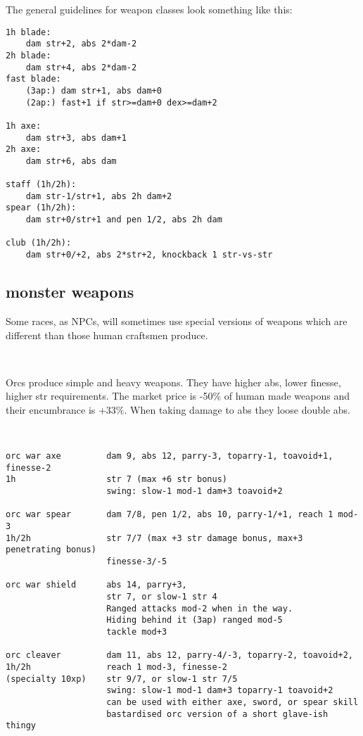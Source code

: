 The general guidelines for weapon classes look something like this:\\
\small \begin{verbatim}
1h blade:
    dam str+2, abs 2*dam-2
2h blade:
    dam str+4, abs 2*dam-2
fast blade:
    (3ap:) dam str+1, abs dam+0
    (2ap:) fast+1 if str>=dam+0 dex>=dam+2

1h axe:
    dam str+3, abs dam+1
2h axe:
    dam str+6, abs dam

staff (1h/2h):
    dam str-1/str+1, abs 2h dam+2
spear (1h/2h):
    dam str+0/str+1 and pen 1/2, abs 2h dam

club (1h/2h):
    dam str+0/+2, abs 2*str+2, knockback 1 str-vs-str
\end{verbatim} \normalsize








\subsection*{monster weapons}
Some races, as NPCs, will sometimes use special versions of weapons which are different than those human craftsmen produce.

\

\noindent Orcs produce simple and heavy weapons. They have higher abs, lower finesse, higher str requirements. The market price is -50\% of human made weapons and their encumbrance is +33\%. When taking damage to abs they loose double abs.

\

\small \begin{verbatim}
orc war axe         dam 9, abs 12, parry-3, toparry-1, toavoid+1, finesse-2
1h                  str 7 (max +6 str bonus)
                    swing: slow-1 mod-1 dam+3 toavoid+2

orc war spear       dam 7/8, pen 1/2, abs 10, parry-1/+1, reach 1 mod-3
1h/2h               str 7/7 (max +3 str damage bonus, max+3 penetrating bonus)
                    finesse-3/-5

orc war shield      abs 14, parry+3,
                    str 7, or slow-1 str 4
                    Ranged attacks mod-2 when in the way.
                    Hiding behind it (3ap) ranged mod-5
                    tackle mod+3

orc cleaver         dam 11, abs 12, parry-4/-3, toparry-2, toavoid+2, 
1h/2h               reach 1 mod-3, finesse-2
(specialty 10xp)    str 9/7, or slow-1 str 7/5
                    swing: slow-1 mod-1 dam+3 toparry-1 toavoid+2
                    can be used with either axe, sword, or spear skill
                    bastardised orc version of a short glave-ish thingy
\end{verbatim} \normalsize

